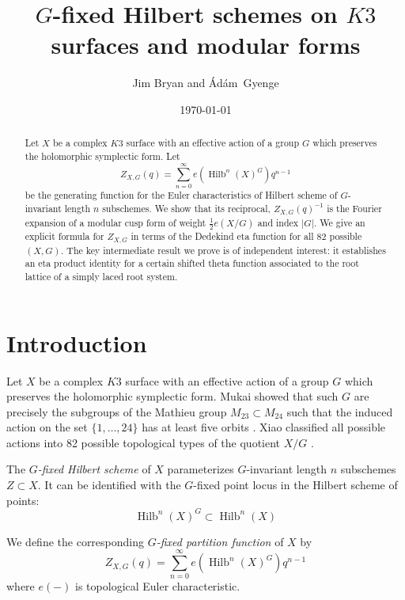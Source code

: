 \documentclass{article}
\title{$G$-fixed Hilbert schemes on $K3$ surfaces and modular forms}
\author{Jim Bryan and \'{A}d\'{a}m~Gyenge}
\date{\today}
\theoremstyle{definition}
\newcommand{\half}{\frac{1}{2}}
\newcommand{\Hilb}{\operatorname{Hilb}}
\begin{document}
\maketitle


\begin{abstract}
Let $X$ be a complex $K3$ surface with an effective action of a group
$G$ which preserves the holomorphic symplectic form. Let 
\[
Z_{X,G}(q) = \sum_{n=0}^{\infty} e(\Hilb^{n}(X)^{G})q^{n-1}
\]
be the generating function for the Euler characteristics of Hilbert
scheme of $G$-invariant length $n$ subschemes. We show that its
reciprocal, $Z_{X,G}(q)^{-1}$ is the Fourier expansion of a modular
cusp form of weight $\half e(X/G)$ and index $|G|$. We give an
explicit formula for $Z_{X,G}$ in terms of the Dedekind eta function
for all 82 possible $(X,G)$. The key intermediate result we prove is
of independent interest: it establishes an eta product identity for a
certain shifted theta function associated to the root lattice of a
simply laced root system.
\end{abstract}








\section{Introduction}

Let $X$ be a complex $K3$ surface with an effective action of a group
$G$ which preserves the holomorphic symplectic form. Mukai showed that
such $G$ are precisely the subgroups of the Mathieu group
$M_{23}\subset M_{24}$ such that the induced action on the set
$\{1,\dots ,24 \}$ has at least five orbits
\cite{mukai1988finite}. Xiao classified all possible actions into
82 possible topological types of the quotient $X/G$ \cite{xiao1996galois}.

The \emph{$G$-fixed Hilbert scheme} of $X$ parameterizes
$G$-invariant length $n$ subschemes $Z\subset X$. It can be
identified with the $G$-fixed point locus in the Hilbert scheme of
points: 
\[
\Hilb^{n}(X)^{G} \subset \Hilb^{n}(X)
\]

We define the corresponding \emph{$G$-fixed partition function} of
$X$ by
\[
Z_{X,G}(q) = \sum_{n=0}^{\infty} e\left(\Hilb^{n}(X)^{G} \right) q^{n-1} 
\]
where $e(-)$ is topological Euler characteristic.
\end{document}
